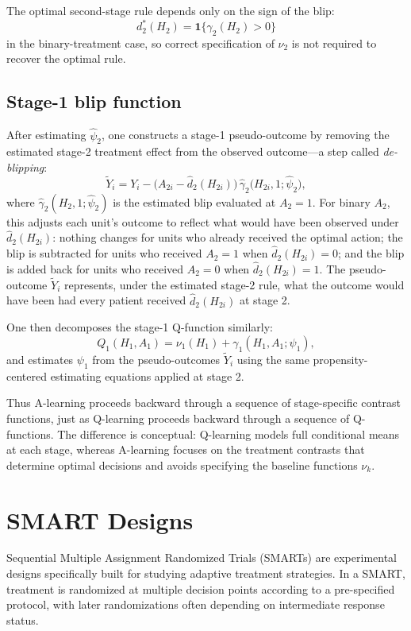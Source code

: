 \documentclass[master.tex]{subfiles}
\begin{document}
The optimal second-stage rule depends only on the sign of the blip:
\[
d_2^*(H_2) = \mathbf{1}\{\gamma_2(H_2) > 0\}
\]
in the binary-treatment case, so correct specification of $\nu_2$ is not required to recover the optimal rule.

\subsection{Stage-1 blip function}

After estimating $\hat\psi_2$, one constructs a stage-1 pseudo-outcome
by removing the estimated stage-2 treatment effect from the observed
outcome---a step called \emph{de-blipping}:
\[
\tilde Y_i
= Y_i - \bigl(A_{2i} - \hat d_2(H_{2i})\bigr)\,
  \hat\gamma_2\bigl(H_{2i}, 1;\hat\psi_2\bigr),
\]
where $\hat\gamma_2(H_2,1;\hat\psi_2)$ is the estimated blip evaluated at
$A_2=1$.  For binary $A_2$, this adjusts each unit's outcome to reflect
what would have been observed under $\hat d_2(H_{2i})$: nothing changes
for units who already received the optimal action; the blip is subtracted
for units who received $A_2=1$ when $\hat d_2(H_{2i})=0$; and the blip
is added back for units who received $A_2=0$ when $\hat d_2(H_{2i})=1$.
The pseudo-outcome $\tilde Y_i$ represents, under the estimated stage-2
rule, what the outcome would have been had every patient received
$\hat d_2(H_{2i})$ at stage 2.

One then decomposes the stage-1 Q-function similarly:
\[
Q_1(H_1,A_1)=\nu_1(H_1)+\gamma_1(H_1,A_1;\psi_1),
\]
and estimates $\psi_1$ from the pseudo-outcomes $\tilde Y_i$ using the
same propensity-centered estimating equations applied at stage 2.

Thus A-learning proceeds backward through a sequence of stage-specific contrast functions, just as Q-learning proceeds backward through a sequence of Q-functions. The difference is conceptual: Q-learning models full conditional means at each stage, whereas A-learning focuses on the treatment contrasts that determine optimal decisions and avoids specifying the baseline functions $\nu_k$.

\section{SMART Designs}
\label{w15:sec:smart}

Sequential Multiple Assignment Randomized Trials (SMARTs) are experimental designs specifically built for studying adaptive treatment strategies. In a SMART, treatment is randomized at multiple decision points according to a pre-specified protocol, with later randomizations often depending on intermediate response status.
\end{document}
